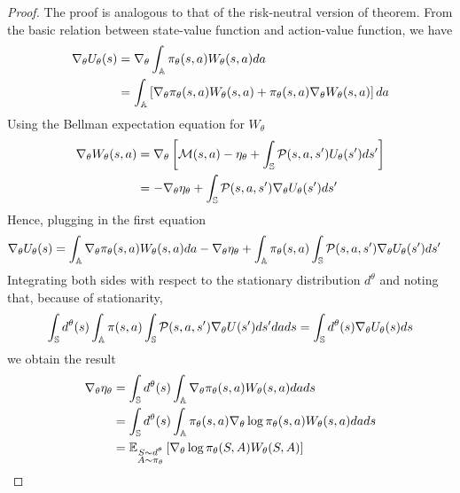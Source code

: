 \begin{proof}
	The proof is analogous to that of the risk-neutral version of theorem. From the basic relation between state-value function and action-value function, we have
		\begin{equation*}
			\begin{split}
				\nabla_\theta U_\theta(s) &= \nabla_\theta \int_{\A} \pi_\theta(s,a) W_\theta(s,a) da\\
					&= \int_{\A} \left[ \nabla_\theta \pi_\theta(s,a) W_\theta(s,a) + \pi_\theta(s,a) \nabla_\theta W_\theta(s,a)\right] da
			\end{split}
		\end{equation*} 
		Using the Bellman expectation equation for $W_\theta$ 
		\begin{equation*}
			\begin{split}
				\nabla_\theta W_\theta(s,a) &= \nabla_\theta \left[ \calM(s,a) - \eta_\theta + \int_{\S} \calP(s,a,s') U_\theta(s') ds' \right]\\
				&= -\nabla_\theta \eta_\theta + \int_{\S} \calP(s,a,s') \nabla_\theta U_\theta(s') ds'
			\end{split}
		\end{equation*}
		Hence, plugging in the first equation 
		\begin{equation*}
			\begin{split}
				\nabla_\theta U_\theta(s) &= \int_{\A} \nabla_\theta \pi_\theta(s,a) W_\theta(s,a) da - \nabla_\theta \eta_\theta + \int_\A \pi_\theta(s,a) \int_{\S} \calP(s,a,s') \nabla_\theta U_\theta(s') ds' 
			\end{split}
		\end{equation*} 	
		Integrating both sides with respect to the stationary distribution $d^\theta$ and noting that, because of stationarity,  
		\begin{equation*}
			\int_{\S} d^\theta(s) \int_{\A} \pi(s,a) \int_{\S} \calP(s,a,s') \nabla_\theta U(s') ds' da ds = \int_{\S} d^\theta(s) \nabla_\theta U_\theta(s) ds
		\end{equation*}
		we obtain the result 
		\begin{equation*}
			\begin{split}
			\nabla_\theta \eta_\theta &= \int_{\S} d^\theta(s) \int_{\A} \nabla_\theta \pi_\theta(s,a) W_\theta(s,a) da ds\\
			&= \int_{\S} d^\theta(s) \int_{\A} \pi_\theta(s,a) \nabla_\theta \log\pi_\theta(s,a) W_\theta(s,a) da ds\\
			&= \E[\substack{S \sim d^\theta\\A \sim \pi_\theta}]{\nabla_\theta\log
					\pi_\theta(S,A) W_{\theta}(S, A)} 
			\end{split}
		\end{equation*}
\end{proof}

